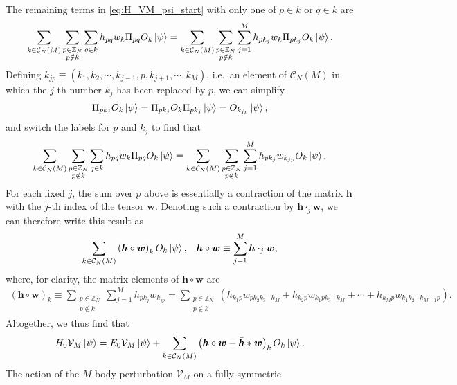 \documentclass[nofootinbib,notitlepage,11pt]{revtex4-2}
\newcommand{\p}[1]{\left(#1\right)} %
\renewcommand{\c}{\cdot} %
\newcommand{\m}{\bm} %
\newcommand{\1}{\mathds{1}}
\newcommand{\C}{\mathcal{C}}
\newcommand{\V}{\mathcal{V}}
\newcommand{\ZZ}{\mathbb{Z}}
\begin{document}
The remaining terms in \eqref{eq:H_VM_psi_start} with only one of
$p\in k$ or $q\in k$ are
\begin{align}
  \sum_{k\in\C_N\p{M}} \sum_{\substack{p\in\ZZ_N\\p\notin k}} \sum_{q\in k}
  h_{pq} w_k \Pi_{pq} O_k \ket\psi
  = \sum_{k\in\C_N\p{M}} \sum_{\substack{p\in\ZZ_N\\p\notin k}}
  \sum_{j=1}^M h_{p k_j} w_k \Pi_{p k_j} O_k \ket\psi.
\end{align}
Defining
$k_{jp}\equiv\p{k_1,k_2,\cdots,k_{j-1},p,k_{j+1},\cdots,k_M}$, i.e.~an
element of $\C_N\p{M}$ in which the $j$-th number $k_j$ has been
replaced by $p$, we can simplify
\begin{align}
  \Pi_{p k_j} O_k \ket\psi
  = \Pi_{p k_j} O_k \Pi_{p k_j} \ket\psi
  = O_{k_{jp}}\ket\psi,
\end{align}
and switch the labels for $p$ and $k_j$ to find that
\begin{align}
  \sum_{k\in\C_N\p{M}} \sum_{\substack{p\in\ZZ_N\\p\notin k}} \sum_{q\in k}
  h_{pq} w_k  \Pi_{pq} O_k \ket\psi
  = \sum_{k\in\C_N\p{M}} \sum_{\substack{p\in\ZZ_N\\p\notin k}}
  \sum_{j=1}^M h_{pk_j} w_{k_{jp}} O_k \ket\psi.
\end{align}
For each fixed $j$, the sum over $p$ above is essentially a
contraction of the matrix $\m h$ with the $j$-th index of the tensor
$\m w$.  Denoting such a contraction by $\m h\c_j\m w$, we can
therefore write this result as
\begin{align}
  \sum_{k\in\C_N\p{M}} \p{\m h\circ \m w}_k O_k \ket\psi,
  &&
  \m h\circ\m w \equiv \sum_{j=1}^M \m h\c_j\m w,
\end{align}
where, for clarity, the matrix elements of $\m h\circ\m w$ are
\begin{align}
  \p{\m h\circ\m w}_k
  \equiv \sum_{\substack{p\in\ZZ_N\\p\notin k}} \sum_{j=1}^M
  h_{pk_j} w_{k_{jp}}
  = \sum_{\substack{p\in\ZZ_N\\p\notin k}}
  \p{h_{k_1 p} w_{pk_2k_3\cdots k_M}
    + h_{k_2 p} w_{k_1pk_3\cdots k_M}
    + \cdots + h_{k_M p} w_{k_1k_2\cdots k_{M-1} p}}.
\end{align}
Altogether, we thus find that
\begin{align}
  H_0 \V_M \ket\psi
  = E_0 \V_M \ket\psi + \sum_{k\in\C_N\p{M}}
  \p{\m h\circ\m w - \bar{\m h} * \m w}_k O_k \ket\psi.
  \label{eq:H_VM_psi_end}
\end{align}
The action of the $M$-body perturbation $\V_M$ on a fully symmetric
\end{document}
